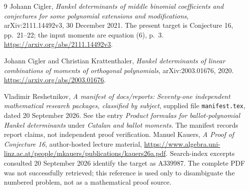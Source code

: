 \documentclass[11pt]{article}
\theoremstyle{definition}
\theoremstyle{remark}
\numberwithin{equation}{section}
\begin{document}
\begin{thebibliography}{9}
Johann Cigler,
\emph{Hankel determinants of middle binomial coefficients and conjectures
for some polynomial extensions and modifications},
arXiv:2111.14492v3, 30 December 2021.
The present target is Conjecture 16, pp.~21--22; the input moments are
equation (6), p.~3.
\url{https://arxiv.org/abs/2111.14492v3}.

Johann Cigler and Christian Krattenthaler,
\emph{Hankel determinants of linear combinations of moments of orthogonal
polynomials}, arXiv:2003.01676, 2020.
\url{https://arxiv.org/abs/2003.01676}.

Vladimir Reshetnikov,
\emph{A manifest of docs/reports: Seventy-one independent mathematical
research packages, classified by subject}, supplied file
\texttt{manifest.tex}, dated 20 September 2026.
See the entry \emph{Product formulas for ballot-polynomial Hankel
determinants} under \emph{Catalan and ballot moments}.
The manifest records report claims, not independent proof verification.
Manuel Kauers,
\emph{A Proof of Conjecture 16}, author-hosted lecture material,
\url{https://www.algebra.uni-linz.ac.at/people/mkauers/publications/kauers26a.pdf}.
Search-index excerpts consulted 20 September 2026 identify the target as
A339987. The complete PDF was not successfully retrieved; this reference
is used only to disambiguate the numbered problem, not as a mathematical
proof source.
\end{thebibliography}
\end{document}
